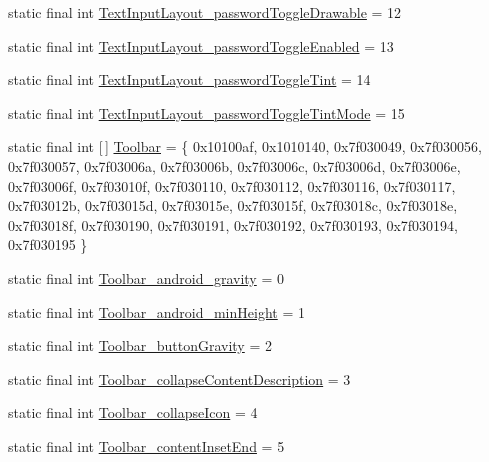 \begin{DoxyCompactItemize}
\item 
static final int \mbox{\hyperlink{classandroid_1_1support_1_1design_1_1_r_1_1styleable_a0559e804ed9bbab5f177abc693e96238}{Text\+Input\+Layout\+\_\+password\+Toggle\+Drawable}} = 12
\item 
static final int \mbox{\hyperlink{classandroid_1_1support_1_1design_1_1_r_1_1styleable_ab9f843954b547744d3c583c046a1ae25}{Text\+Input\+Layout\+\_\+password\+Toggle\+Enabled}} = 13
\item 
static final int \mbox{\hyperlink{classandroid_1_1support_1_1design_1_1_r_1_1styleable_a561ddb9abdf72013c7c9f63ed6e3ce57}{Text\+Input\+Layout\+\_\+password\+Toggle\+Tint}} = 14
\item 
static final int \mbox{\hyperlink{classandroid_1_1support_1_1design_1_1_r_1_1styleable_aafbf1a87eadb8c4597771e237a0ca57b}{Text\+Input\+Layout\+\_\+password\+Toggle\+Tint\+Mode}} = 15
\item 
static final int \mbox{[}$\,$\mbox{]} \mbox{\hyperlink{classandroid_1_1support_1_1design_1_1_r_1_1styleable_a7783ebe780dbe2a845802a40519a46e9}{Toolbar}} = \{ 0x10100af, 0x1010140, 0x7f030049, 0x7f030056, 0x7f030057, 0x7f03006a, 0x7f03006b, 0x7f03006c, 0x7f03006d, 0x7f03006e, 0x7f03006f, 0x7f03010f, 0x7f030110, 0x7f030112, 0x7f030116, 0x7f030117, 0x7f03012b, 0x7f03015d, 0x7f03015e, 0x7f03015f, 0x7f03018c, 0x7f03018e, 0x7f03018f, 0x7f030190, 0x7f030191, 0x7f030192, 0x7f030193, 0x7f030194, 0x7f030195 \}
\item 
static final int \mbox{\hyperlink{classandroid_1_1support_1_1design_1_1_r_1_1styleable_ae9f189e116f70336a287fd07ccbad870}{Toolbar\+\_\+android\+\_\+gravity}} = 0
\item 
static final int \mbox{\hyperlink{classandroid_1_1support_1_1design_1_1_r_1_1styleable_a577363bd15a566f94f5c7a9f24cf1ab5}{Toolbar\+\_\+android\+\_\+min\+Height}} = 1
\item 
static final int \mbox{\hyperlink{classandroid_1_1support_1_1design_1_1_r_1_1styleable_ab8977566ee7aef9bbce4cfa04b80db1e}{Toolbar\+\_\+button\+Gravity}} = 2
\item 
static final int \mbox{\hyperlink{classandroid_1_1support_1_1design_1_1_r_1_1styleable_a2ad949787d7fa8e09c179eaa0ebb74aa}{Toolbar\+\_\+collapse\+Content\+Description}} = 3
\item 
static final int \mbox{\hyperlink{classandroid_1_1support_1_1design_1_1_r_1_1styleable_a89d8fbe1d316576ebe59e92d248279a6}{Toolbar\+\_\+collapse\+Icon}} = 4
\item 
static final int \mbox{\hyperlink{classandroid_1_1support_1_1design_1_1_r_1_1styleable_a1a5e3de0eef2c8b8ce35918ff513531a}{Toolbar\+\_\+content\+Inset\+End}} = 5

\end{DoxyCompactItemize}
